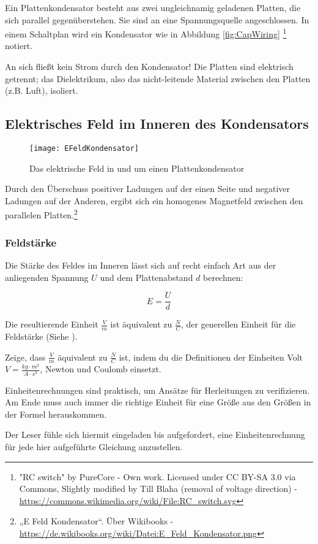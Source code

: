 Ein Plattenkondensator besteht aus zwei ungleichnamig geladenen Platten, die sich parallel gegenüberstehen. Sie sind an eine Spannungsquelle angeschlossen. In einem Schaltplan wird ein Kondensator wie in Abbildung \ref{fig:CapWiring} \footnote{"RC switch" by PureCore - Own work. Licensed under CC BY-SA 3.0 via Commons, Slightly modified by Till Blaha (removal of voltage direction) - \url{https://commons.wikimedia.org/wiki/File:RC_switch.svg}} notiert.

\begin{Wichtig}
An sich fließt kein Strom durch den Kondensator! Die Platten sind elektrisch getrennt; das Dielektrikum, also das nicht-leitende Material zwischen den Platten (z.B. Luft), isoliert. 
\end{Wichtig}


\subsection{Elektrisches Feld im Inneren des Kondensators}

\begin{figure}[h!]
	\centering
	\texttt{[image: EFeldKondensator]}
	\caption{Das elektrische Feld in und um einen Plattenkondensator}
\end{figure}

Durch den Überschuss positiver Ladungen auf der einen Seite und negativer Ladungen auf der Anderen, ergibt sich ein homogenes Magnetfeld zwischen den parallelen Platten.\footnote{„E Feld Kondensator“. Über Wikibooks - \url{https://de.wikibooks.org/wiki/Datei:E_Feld_Kondensator.png}}

\subsubsection{Feldstärke}

Die Stärke des Feldes im Inneren lässt sich auf recht einfach Art aus der anliegenden Spannung $U$ und dem Plattenabstand $d$ berechnen:

\begin{equation} \label{eq:feldstaerke_kondensator}
	E = \frac{U}{d}
\end{equation}

Die resultierende Einheit $\frac{V}{m}$ ist äquivalent zu $\frac{N}{C}$, der generellen Einheit für die Feldstärke (Siehe ).

\begin{Aufgabe}
Zeige, dass $\frac{V}{m}$ äquivalent zu $\frac{N}{C}$ ist, indem du die Definitionen der Einheiten Volt $V=\frac{kg \cdot m^2}{A \cdot s^3}$, Newton und Coulomb einsetzt.

Einheitenrechnungen sind praktisch, um Ansätze für Herleitungen zu verifizieren. Am Ende muss auch immer die richtige Einheit für eine Größe aus den Größen in der Formel herauskommen.

Der Leser fühle sich hiermit eingeladen bis aufgefordert, eine Einheitenrechnung für jede hier aufgeführte Gleichung anzustellen. 
\end{Aufgabe}

